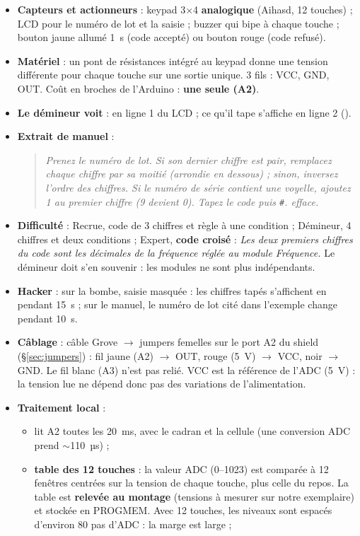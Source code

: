 \documentclass[11pt,a4paper]{article}
\newcommand{\code}[1]{\texttt{\detokenize{#1}}}
\newcommand{\env}{\mbox{$\sim$}}
\newenvironment{manuel}{\begin{quote}\itshape}{\end{quote}}
\begin{document}
\begin{itemize}
  \item \textbf{Capteurs et actionneurs} : keypad 3×4 \textbf{analogique} (Aihasd, 12 touches) ; LCD pour le numéro de lot et la saisie ; buzzer qui bipe à chaque touche ; bouton jaune allumé 1~s (code accepté) ou bouton rouge (code refusé).
  \item \textbf{Matériel} : un pont de résistances intégré au keypad donne une tension différente pour chaque touche sur une sortie unique. 3 fils : VCC, GND, OUT. Coût en broches de l'Arduino : \textbf{une seule (A2)}.
  \item \textbf{Le démineur voit} : \code{LOT 5829} en ligne 1 du LCD ; ce qu'il tape s'affiche en ligne 2 (\code{CODE: 31__}).
  \item \textbf{Extrait de manuel} :
  \begin{manuel}
    Prenez le numéro de lot. Si son dernier chiffre est pair, remplacez chaque chiffre par sa moitié (arrondie en dessous) ; sinon, inversez l'ordre des chiffres. Si le numéro de série contient une voyelle, ajoutez 1 au premier chiffre (9 devient 0). Tapez le code puis \texttt{\#}. \code{*} efface.
  \end{manuel}
  \item \textbf{Difficulté} : Recrue, code de 3 chiffres et règle à une condition ; Démineur, 4 chiffres et deux conditions ; Expert, \textbf{code croisé} : \emph{\og Les deux premiers chiffres du code sont les décimales de la fréquence réglée au module Fréquence.\fg{}} Le démineur doit s'en souvenir : les modules ne sont plus indépendants.
  \item \textbf{Hacker} : sur la bombe, \og saisie masquée\fg{} : les chiffres tapés s'affichent en \code{*} pendant 15~s ; sur le manuel, le numéro de lot cité dans l'exemple change pendant 10~s.
  \item \textbf{Câblage} : câble Grove $\to$ jumpers femelles sur le port A2 du shield (\S\ref{sec:jumpers}) : fil jaune (A2) $\to$ OUT, rouge (5~V) $\to$ VCC, noir $\to$ GND. Le fil blanc (A3) n'est pas relié. VCC est la référence de l'ADC (5~V) : la tension lue ne dépend donc pas des variations de l'alimentation.
  \item \textbf{Traitement local} :
  \begin{itemize}
    \item \code{tSense} lit A2 toutes les 20~ms, avec le cadran et la cellule (une conversion ADC prend \env 110~µs) ;
    \item \textbf{table des 12 touches} : la valeur ADC (0--1023) est comparée à 12 fenêtres centrées sur la tension de chaque touche, plus celle du repos. La table est \textbf{relevée au montage} (tensions à mesurer sur notre exemplaire) et stockée en PROGMEM. Avec 12 touches, les niveaux sont espacés d'environ 80 pas d'ADC : la marge est large ;

\end{itemize}
\end{itemize}
\end{document}
